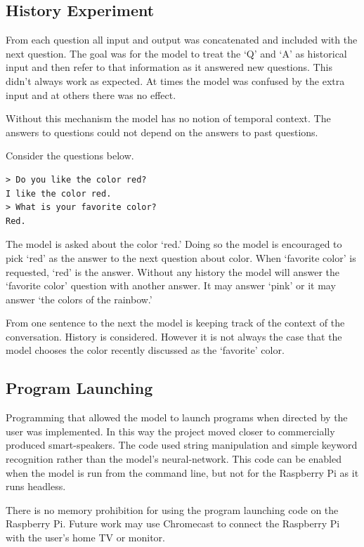 \subsection{History Experiment}
From each question all input and output was concatenated and included with the next question. The goal was for the model to treat the `Q' and `A' as historical input and then refer to that information as it answered new questions. This didn't always work as expected. At times the model was confused by the extra input and at others there was no effect. 

Without this mechanism the model has no notion of temporal context. The answers to questions could not depend on the answers to past questions. %

Consider the questions below.
\begin{verbatim}
> Do you like the color red?
I like the color red.
> What is your favorite color?
Red.
\end{verbatim}

\label{install-gpt2-history}

The model is asked about the color `red.' Doing so the model is encouraged to pick `red' as the answer to the next question about color. When `favorite color' is requested, `red' is the answer. Without any history the model will answer the `favorite color' question with another answer. It may answer `pink' or it may answer `the colors of the rainbow.' 

From one sentence to the next the model is keeping track of the context of the conversation. History is considered. However it is not always the case that the model chooses the color recently discussed as the `favorite' color.


\subsection{Program Launching}

Programming that allowed the model to launch programs when directed by the user was implemented. In this way the project moved closer to commercially produced smart-speakers. The code used string manipulation and simple keyword recognition rather than the model's neural-network. This code can be enabled when the model is run from the command line, but not for the Raspberry Pi as it runs headless.

There is no memory prohibition for using the program launching code on the Raspberry Pi. Future work may use Chromecast to connect the Raspberry Pi with the user's home TV or monitor. 

